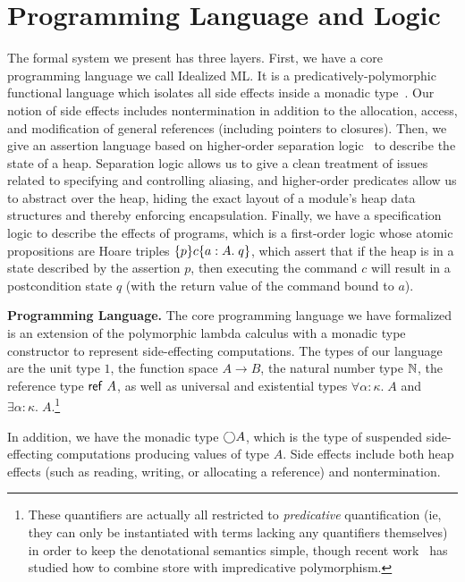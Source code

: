 \documentclass[preprint,natbib]{sigplanconf}
\begin{document}
\section{Programming Language and Logic}

The formal system we present has three layers. First, we have a core
programming language we call Idealized ML. It is a
predicatively-polymorphic functional language which isolates all side
effects inside a monadic type~\cite{pfenning-davies}. Our notion of
side effects includes nontermination in addition to the allocation,
access, and modification of general references (including pointers to
closures).  Then, we give an assertion language based on higher-order
separation logic~\cite{hosl} to describe the state of a
heap. Separation logic allows us to give a clean treatment of issues
related to specifying and controlling aliasing, and higher-order
predicates allow us to abstract over the heap, hiding the exact layout
of a module's heap data structures and thereby enforcing
encapsulation.  Finally, we have a specification logic to describe the
effects of programs, which is a first-order logic whose atomic
propositions are Hoare triples $\{{p}\}{c}\{{a:A}.\;{q}\}$, which assert
that if the heap is in a state described by the assertion $p$, then
executing the command $c$ will result in a postcondition state $q$
(with the return value of the command bound to $a$).


\textbf{Programming Language.} The core programming language we have
formalized is an extension of the polymorphic lambda calculus with a
monadic type constructor to represent side-effecting computations.
The types of our language are the unit type $1$, the function space $A
\to B$, the natural number type $\mathbb{N}$, the reference type
$\mbox{\textsf{{ref }}}A$, as well as universal and existential types $\forall
\alpha:\kappa.\;A$ and $\exists \alpha:\kappa.\;A$.\footnote{These
  quantifiers are actually all restricted to \emph{predicative}
  quantification (ie, they can only be instantiated with terms
  lacking any quantifiers themselves) in order to keep the
  denotational semantics simple, though recent
  work~\cite{birkedal-impred} has studied how to combine store with
  impredicative polymorphism.}

In addition, we have the monadic type $\bigcirc{A}$, which is the type
of suspended side-effecting computations producing values of type
$A$. Side effects include both heap effects (such as reading, writing,
or allocating a reference) and nontermination.
\end{document}
